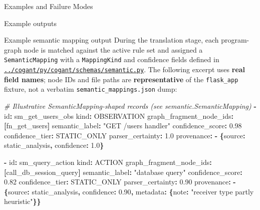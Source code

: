 \documentclass[
  ignorenonframetext,
]{beamer}
\newenvironment{Shaded}{}{}
\newcommand{\AttributeTok}[1]{\textcolor[rgb]{0.49,0.56,0.16}{#1}}
\newcommand{\CommentTok}[1]{\textcolor[rgb]{0.38,0.63,0.69}{\textit{#1}}}
\newcommand{\FloatTok}[1]{\textcolor[rgb]{0.25,0.63,0.44}{#1}}
\newcommand{\FunctionTok}[1]{\textcolor[rgb]{0.02,0.16,0.49}{#1}}
\newcommand{\KeywordTok}[1]{\textcolor[rgb]{0.00,0.44,0.13}{\textbf{#1}}}
\newcommand{\StringTok}[1]{\textcolor[rgb]{0.25,0.44,0.63}{#1}}
\begin{document}
\begin{frame}[fragile]{Examples and Failure Modes}
\begin{block}{Example outputs}
\begin{block}{Example semantic mapping output}
\protect{}\label{example-semantic-mapping-output}
During the translation stage, each program-graph node is matched against
the active rule set and assigned a \texttt{SemanticMapping} with a
\texttt{MappingKind} and confidence fields defined in
\href{../cogant/py/cogant/schemas/semantic.py}{\texttt{../cogant/py/cogant/schemas/semantic.py}}.
The following excerpt uses \textbf{real field names}; node IDs and file
paths are \textbf{representative} of the \texttt{flask\_app} fixture,
not a verbatim \texttt{semantic\_mappings.json} dump:

\begin{Shaded}
\begin{Highlighting}[]
\CommentTok{\# Illustrative SemanticMapping{-}shaped records (see semantic.SemanticMapping)}
\KeywordTok{{-}}\AttributeTok{ }\FunctionTok{id}\KeywordTok{:}\AttributeTok{ sm\_get\_users\_obs}
\AttributeTok{  }\FunctionTok{kind}\KeywordTok{:}\AttributeTok{ OBSERVATION}
\AttributeTok{  }\FunctionTok{graph\_fragment\_node\_ids}\KeywordTok{:}\AttributeTok{ }\KeywordTok{[}\AttributeTok{fn\_get\_users}\KeywordTok{]}
\AttributeTok{  }\FunctionTok{semantic\_label}\KeywordTok{:}\AttributeTok{ }\StringTok{"GET /users handler"}
\AttributeTok{  }\FunctionTok{confidence\_score}\KeywordTok{:}\AttributeTok{ }\FloatTok{0.98}
\AttributeTok{  }\FunctionTok{confidence\_tier}\KeywordTok{:}\AttributeTok{ STATIC\_ONLY}
\AttributeTok{  }\FunctionTok{parser\_certainty}\KeywordTok{:}\AttributeTok{ }\FloatTok{1.0}
\AttributeTok{  }\FunctionTok{provenance}\KeywordTok{:}
\AttributeTok{    }\KeywordTok{{-}}\AttributeTok{ }\KeywordTok{\{}\FunctionTok{source}\KeywordTok{:}\AttributeTok{ static\_analysis}\KeywordTok{,}\AttributeTok{ }\FunctionTok{confidence}\KeywordTok{:}\AttributeTok{ }\FloatTok{1.0}\KeywordTok{\}}

\KeywordTok{{-}}\AttributeTok{ }\FunctionTok{id}\KeywordTok{:}\AttributeTok{ sm\_query\_action}
\AttributeTok{  }\FunctionTok{kind}\KeywordTok{:}\AttributeTok{ ACTION}
\AttributeTok{  }\FunctionTok{graph\_fragment\_node\_ids}\KeywordTok{:}\AttributeTok{ }\KeywordTok{[}\AttributeTok{call\_db\_session\_query}\KeywordTok{]}
\AttributeTok{  }\FunctionTok{semantic\_label}\KeywordTok{:}\AttributeTok{ }\StringTok{"database query"}
\AttributeTok{  }\FunctionTok{confidence\_score}\KeywordTok{:}\AttributeTok{ }\FloatTok{0.82}
\AttributeTok{  }\FunctionTok{confidence\_tier}\KeywordTok{:}\AttributeTok{ STATIC\_ONLY}
\AttributeTok{  }\FunctionTok{parser\_certainty}\KeywordTok{:}\AttributeTok{ }\FloatTok{0.90}
\AttributeTok{  }\FunctionTok{provenance}\KeywordTok{:}
\AttributeTok{    }\KeywordTok{{-}}\AttributeTok{ }\KeywordTok{\{}\FunctionTok{source}\KeywordTok{:}\AttributeTok{ static\_analysis}\KeywordTok{,}\AttributeTok{ }\FunctionTok{confidence}\KeywordTok{:}\AttributeTok{ }\FloatTok{0.90}\KeywordTok{,}\AttributeTok{ }\FunctionTok{metadata}\KeywordTok{:}\AttributeTok{ }\KeywordTok{\{}\FunctionTok{note}\KeywordTok{:}\AttributeTok{ }\StringTok{"receiver type partly heuristic"}\KeywordTok{\}\}}


\end{Highlighting}
\end{Shaded}
\end{block}
\end{block}
\end{frame}
\end{document}
